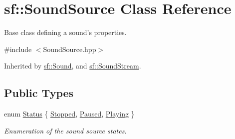 \hypertarget{classsf_1_1_sound_source}{\section{sf\+:\+:Sound\+Source Class Reference}
\label{classsf_1_1_sound_source}
}


Base class defining a sound's properties.  




{\ttfamily \#include $<$Sound\+Source.\+hpp$>$}



Inherited by \hyperlink{classsf_1_1_sound}{sf\+::\+Sound}, and \hyperlink{classsf_1_1_sound_stream}{sf\+::\+Sound\+Stream}.

\subsection*{Public Types}
\begin{DoxyCompactItemize}
\item 
enum \hyperlink{classsf_1_1_sound_source_ac43af72c98c077500b239bc75b812f03}{Status} \{ \hyperlink{classsf_1_1_sound_source_ac43af72c98c077500b239bc75b812f03adabb01e8aa85b2f54b344890addf764a}{Stopped}, 
\hyperlink{classsf_1_1_sound_source_ac43af72c98c077500b239bc75b812f03ac3ca1fcc0394267c9bdbe3dc0a8a7e41}{Paused}, 
\hyperlink{classsf_1_1_sound_source_ac43af72c98c077500b239bc75b812f03af07bdea9f70ef7606dfc9f955beeee18}{Playing}
 \}
\begin{DoxyCompactList}\small\item\em Enumeration of the sound source states. \end{DoxyCompactList}\end{DoxyCompactItemize}
